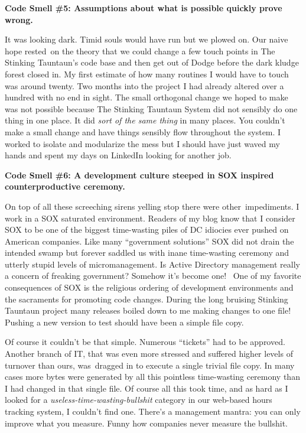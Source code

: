 \medskip
\noindent\textbf{Code Smell \#5: Assumptions about what is possible quickly
prove wrong.}
\medskip


It was looking dark. Timid souls would have run but we plowed on. Our
naive hope rested~on the theory that we could change a few touch points
in The Stinking Tauntaun's code base and then get out of Dodge before
the dark kludge forest closed in. My first estimate of how many routines
I would have to touch was around twenty. Two months into the project I
had already altered over a hundred with no end in sight. The small
orthogonal change we hoped to make was not possible because The Stinking
Tauntaun System did not sensibly do one thing in one place. It did
\emph{sort of the same thing} in many places. You couldn't make a small
change and have things sensibly flow throughout the system. I worked to
isolate and modularize the mess but I should have just waved my hands
and spent my days on LinkedIn looking for another job.

\medskip
\noindent\textbf{Code Smell \#6: A development culture steeped in
SOX inspired counterproductive ceremony.}
\medskip

On top of all these screeching sirens yelling stop there were
other~impediments. I work in a SOX saturated environment. Readers of my
blog know that I consider SOX to be one of the biggest time-wasting
piles of DC idiocies ever pushed on American companies. Like many
``government solutions'' SOX did not drain the intended swamp but
forever saddled us with inane time-wasting ceremony and utterly stupid
levels of micromanagement. Is Active Directory management really a
concern of freaking government? Somehow it's become one!~ One of my
favorite consequences of SOX is the religious ordering of development
environments and the sacraments for promoting code changes. During the
long bruising Stinking Tauntaun project many releases boiled down to me
making changes to one file! Pushing a new version to test should have
been a simple file copy.

Of course it couldn't be that simple. Numerous ``tickets'' had to be
approved. Another branch of IT, that was even more stressed and suffered
higher levels of turnover than ours, was~dragged in to execute a single
trivial file copy. In many cases more bytes were generated by all this
pointless time-wasting ceremony than I had changed in that single file.
Of course all this took time, and as hard as I looked for a
\emph{useless-time-wasting-bullshit} category in our web-based hours
tracking system, I couldn't find one. There's a management mantra: you
can only improve what you measure. Funny how companies never measure
the bullshit.

